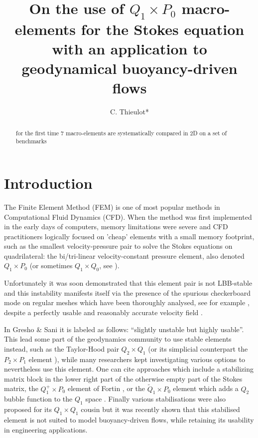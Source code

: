 \documentclass[a4paper,12pt]{article}
\title{
On the use of $Q_1\times P_0$ macro-elements for the Stokes equation with an application to 
geodynamical buoyancy-driven flows
}
\author{C. Thieulot*}
\begin{document}
\maketitle

\begin{abstract}
for the first time 7 macro-elements are systematically compared in 2D on a set of benchmarks
\end{abstract}

\tableofcontents

\section{Introduction} \label{sec1}


The Finite Element Method (FEM) is one of most popular methods in Computational Fluid Dynamics (CFD). 
When the method was first implemented 
in the early days of computers, memory limitations were severe and CFD practitioners logically 
focused on 'cheap' elements with a small memory footprint, such as the smallest velocity-pressure pair to 
solve the Stokes equations on quadrilateral: the bi/tri-linear velocity-constant pressure element, 
also denoted $Q_1 \times P_0$ (or sometimes $Q_1\times Q_0$, see \cite{grsa}). 

Unfortunately it was soon demonstrated that this element pair is not LBB-stable \cite{boni84,boni85} and this instability
manifests itself via the presence of the spurious checkerboard mode on regular meshes
which have been thoroughly analysed, see for example \cite{grsi94,chpc95,sagl81a,sagl81b}, 
despite a perfectly usable and reasonably accurate velocity field \cite{grsa,dohu03,bobf08,bobf13}.


In Gresho \& Sani \cite{grsa} it is labeled as follows: ``slightly unstable but highly usable''.
This lead some part of the geodynamics community to use stable elements instead, 
such as the Taylor-Hood pair $Q_2\times Q_1$
(or its simplicial counterpart the $P_2\times P_1$ element \cite{thba25}), 
while many researchers kept investigating various options to nevertheless use this element.
One can cite approaches which include a stabilizing matrix block in the lower right part of 
the otherwise empty part of the Stokes matrix\cite{kesi88,sike90,vibo92,nosi98},
the $Q_1^+\times P_0$ element of Fortin \cite{fort81}, or the $\tilde{Q}_1\times P_0$ element which adds 
a $Q_2$ bubble function to the $Q_1$ space \cite[p265]{brfo}.
Finally various stabilisations were also proposed for its 
$Q_1\times Q_1$ cousin \cite{dobo04,bodg06,busa13} but it was recently shown\cite{thba22} 
that this stabilised element is not suited to model buoyancy-driven flows, 
while retaining its usability in engineering applications.  
\end{document}
